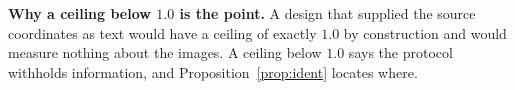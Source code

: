 \textbf{Why a ceiling below $1.0$ is the point.} A design that supplied the source coordinates as text
would have a ceiling of exactly $1.0$ by construction and would measure nothing about the images. A ceiling
below $1.0$ says the protocol withholds information, and Proposition~\ref{prop:ident} locates where.
